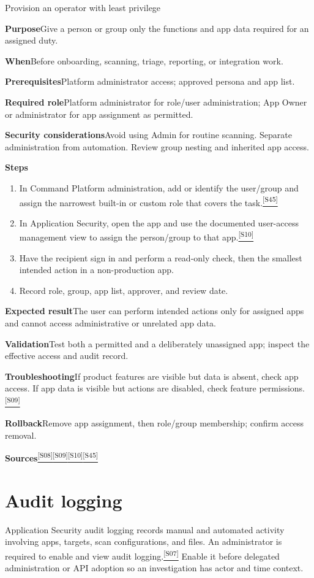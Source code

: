 \documentclass[11pt,letterpaper,oneside]{scrreprt}
\newcommand{\src}[1]{\hyperref[src:#1]{\textsuperscript{\color{R7Orange}[#1]}}}
\newcommand{\field}[1]{\par\smallskip\noindent\textbf{#1}\quad}
\begin{document}
\begin{procedure}{Provision an operator with least privilege}
\field{Purpose}Give a person or group only the functions and app data required for an assigned duty.
\field{When}Before onboarding, scanning, triage, reporting, or integration work.
\field{Prerequisites}Platform administrator access; approved persona and app list.
\field{Required role}Platform administrator for role/user administration; App Owner or administrator for app assignment as permitted.
\field{Security considerations}Avoid using Admin for routine scanning. Separate administration from automation. Review group nesting and inherited app access.
\field{Steps}
\begin{enumerate}
  \item In Command Platform administration, add or identify the user/group and assign the narrowest built-in or custom role that covers the task.\src{S45}
  \item In Application Security, open the app and use the documented user-access management view to assign the person/group to that app.\src{S10}
  \item Have the recipient sign in and perform a read-only check, then the smallest intended action in a non-production app.
  \item Record role, group, app list, approver, and review date.
\end{enumerate}
\field{Expected result}The user can perform intended actions only for assigned apps and cannot access administrative or unrelated app data.
\field{Validation}Test both a permitted and a deliberately unassigned app; inspect the effective access and audit record.
\field{Troubleshooting}If product features are visible but data is absent, check app access. If app data is visible but actions are disabled, check feature permissions.\src{S09}
\field{Rollback}Remove app assignment, then role/group membership; confirm access removal.
\field{Sources}\src{S08}\src{S09}\src{S10}\src{S45}
\end{procedure}

\section{Audit logging}
Application Security audit logging records manual and automated activity involving apps, targets, scan configurations, and files. An administrator is required to enable and view audit logging.\src{S07} Enable it before delegated administration or API adoption so an investigation has actor and time context.
\end{document}

